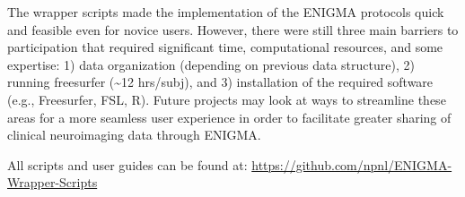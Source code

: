 \documentclass[twocolumn]{bmcart}%
\begin{document}
The wrapper scripts made the implementation of the ENIGMA protocols
quick and feasible even for novice users. However, there were still
three main barriers to participation that required significant time,
computational resources, and some expertise: 1) data organization
(depending on previous data structure), 2) running freesurfer
(\textasciitilde{}12 hrs/subj), and 3) installation of the required
software (e.g., Freesurfer, FSL, R). Future projects may look at ways to
streamline these areas for a more seamless user experience in order to
facilitate greater sharing of clinical neuroimaging data through ENIGMA.

All scripts and user guides can be found at:
\url{https://github.com/npnl/ENIGMA-Wrapper-Scripts}

\end{document}

